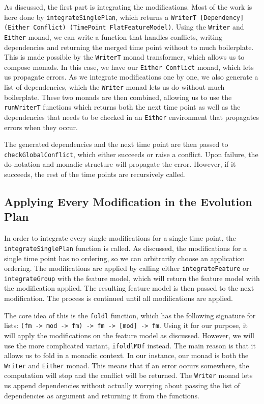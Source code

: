 \documentclass[a4paper,english]{ifimaster}
\begin{document}
As discussed, the first part is integrating the modifications. Most of the work is here done by \texttt{integrateSinglePlan}, which returns a \texttt{WriterT [Dependency] (Either Conflict) (TimePoint FlatFeatureModel)}. Using the \texttt{Writer} and \texttt{Either} monad, we can write a function that handles conflicts, writing dependencies and returning the merged time point without to much boilerplate. This is made possible by the \texttt{WriterT} monad transformer, which allows us to compose monads. In this case, we have our \texttt{Either Conflict} monad, which lets us propagate errors. As we integrate modifications one by one, we also generate a list of dependencies, which the \texttt{Writer} monad lets us do without much boilerplate. These two monads are then combined, allowing us to use the \texttt{runWriterT} functions which returns both the next time point as well as the dependencies that needs to be checked in an \texttt{Either} environment that propagates errors when they occur.

The generated dependencies and the next time point are then passed to \texttt{checkGlobalConflict}, which either succeeds or raise a conflict. Upon failure, the do-notation and monadic structure will propagate the error. However, if it succeeds, the rest of the time points are recursively called.

\subsection{Applying Every Modification in the Evolution Plan}%
\label{sub:applying_modifications}

In order to integrate every single modifications for a single time point, the \texttt{integrateSinglePlan} function is called. As discussed, the modifications for a single time point has no ordering, so we can arbitrarily choose an application ordering. The modifications are applied by calling either \texttt{integrateFeature} or \texttt{integrateGroup} with the feature model, which will return the feature model with the modification applied. The resulting feature model is then passed to the next modification. The process is continued until all modifications are applied.

The core idea of this is the \texttt{foldl} function, which has the following signature for lists: \texttt{(fm -> mod -> fm) -> fm -> [mod] -> fm}. Using it for our purpose, it will apply the modifications on the feature model as discussed. However, we will use the more complicated variant, \texttt{ifoldlMOf} instead. The main reason is that it allows us to fold in a monadic context. In our instance, our monad is both the \texttt{Writer} and \texttt{Either} monad. This means that if an error occurs somewhere, the computation will stop and the conflict will be returned. The \texttt{Writer} monad lets us append dependencies without actually worrying about passing the list of dependencies as argument and returning it from the functions.
\end{document}
